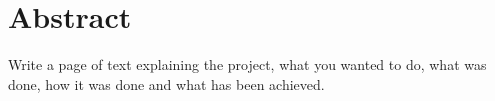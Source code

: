 \section*{Abstract}
Write a page of text explaining the project, what you wanted to do, what was done, how it was done and what has been achieved.
